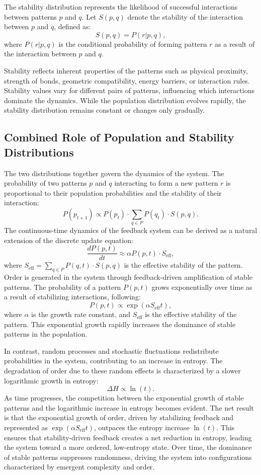 \documentclass[entropy,article,submit,pdftex,moreauthors]{Definitions/mdpi}
\begin{document}
The stability distribution represents the likelihood of successful interactions between patterns \( p \) and \( q \). Let \( S(p, q) \) denote the stability of the interaction between \( p \) and \( q \), defined as:
\[
S(p, q) = P(r | p, q),
\]
where \( P(r | p, q) \) is the conditional probability of forming pattern \( r \) as a result of the interaction between \( p \) and \( q \).

Stability reflects inherent properties of the patterns such as physical proximity, strength of bonds, geometric compatibility, energy barriers, or interaction rules. Stability values vary for different pairs of patterns, influencing which interactions dominate the dynamics. While the population distribution evolves rapidly, the stability distribution remains constant or changes only gradually.

\subsection{Combined Role of Population and Stability Distributions}

The two distributions together govern the dynamics of the system. The probability of two patterns \( p \) and \( q \) interacting to form a new pattern \( r \) is proportional to their population probabilities and the stability of their interaction:
\[
P(p_{t+1}) \propto P(p_t) \cdot \sum_{q \in P} P(q_t) \cdot S(p, q).
\]
The continuous-time dynamics of the feedback system can be derived as a natural extension of the discrete update equation:
\[
\frac{dP(p, t)}{dt} \approx \alpha P(p, t) \cdot S_{\text{eff}},
\]
where \( S_{\text{eff}} = \sum_{q \in P} P(q, t) \cdot S(p, q) \) is the effective stability of the pattern. Order is generated in the system through feedback-driven amplification of stable patterns. The probability of a pattern \( P(p, t) \) grows exponentially over time as a result of stabilizing interactions, following:
\[
P(p, t) \propto \exp(\alpha S_{\text{eff}} t),
\]
where \( \alpha \) is the growth rate constant, and \( S_{\text{eff}} \) is the effective stability of the pattern. This exponential growth rapidly increases the dominance of stable patterns in the population.

In contrast, random processes and stochastic fluctuations redistribute probabilities in the system, contributing to an increase in entropy. The degradation of order due to these random effects is characterized by a slower logarithmic growth in entropy:
\[
\Delta H \propto \ln(t).
\]
As time progresses, the competition between the exponential growth of stable patterns and the logarithmic increase in entropy becomes evident. The net result is that the exponential growth of order, driven by stabilizing feedback and represented as \( \exp(\alpha S_{\text{eff}} t) \), outpaces the entropy increase \( \ln(t) \). This ensures that stability-driven feedback creates a net reduction in entropy, leading the system toward a more ordered, low-entropy state. Over time, the dominance of stable patterns suppresses randomness, driving the system into configurations characterized by emergent complexity and order.
\end{document}
